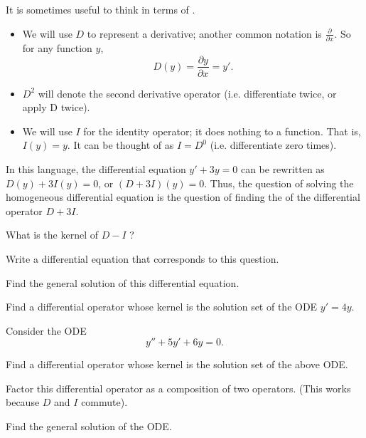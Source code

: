 
\begin{applicationActivities}

\begin{observation}
It is sometimes useful to think in terms of .
\begin{itemize}
\item We will use \(D\) to represent a derivative; another common notation is \(\frac{\partial}{\partial x}\).  So for any function \(y\),  \[D(y)=\frac{\partial y}{\partial x}=y'.\]
\item \(D^2\) will denote the second derivative operator (i.e. differentiate twice, or apply D twice).
\item We will use \(I\) for the identity operator; it does nothing to a function.  That is, \(I(y)=y\).  It can be thought of as \(I=D^0\) (i.e. differentiate zero times).
\end{itemize}
\vfill
In this language, the differential equation \(y'+3y=0\) can be rewritten as \(D(y)+3I(y)=0\), or \( (D+3I)(y)=0\).
\vfill
Thus, the question of solving the homogeneous differential equation is the question of finding the  of the differential operator \(D+3I\).
\end{observation}

\begin{activity}{5}
What is the kernel of \(D-I\) ?
\vfill
\begin{subactivity}
Write a differential equation that corresponds to this question.
\end{subactivity}
\begin{subactivity}
Find the general solution of this differential equation.
\end{subactivity}
\end{activity}

\begin{activity}{5}
Find a differential operator whose kernel is the solution set of the ODE \(y'=4y\).
\end{activity}

\begin{activity}{10}
Consider the ODE \[y''+5y'+6y=0.\]
\vfill
\begin{subactivity}
Find a differential operator whose kernel is the solution set of the above ODE.
\end{subactivity}
\begin{subactivity}
Factor this differential operator as a composition of two operators. (This works because \(D\) and \(I\) commute).
\end{subactivity}
\begin{subactivity}
Find the general solution of the ODE.
\end{subactivity}
\end{activity}


\end{applicationActivities}
